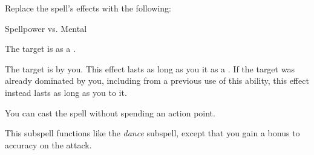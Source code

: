 


Replace the spell's effects with the following:
\begin{spellcontent}

\begin{augmenteffects}




\begin{spellattack}{Spellpower vs. Mental}


\hit
The target is  as a .



\crit
The target is  by you.
This effect lasts as long as you  it as a .
If the target was already dominated by you, including from a previous use of this ability, this effect instead lasts as long as you  to it.



\end{spellattack}





\end{augmenteffects}

\end{spellcontent}





You can cast the spell without spending an action point.






This subspell functions like the \textit{dance} subspell, except that you gain a  bonus to accuracy on the attack.





